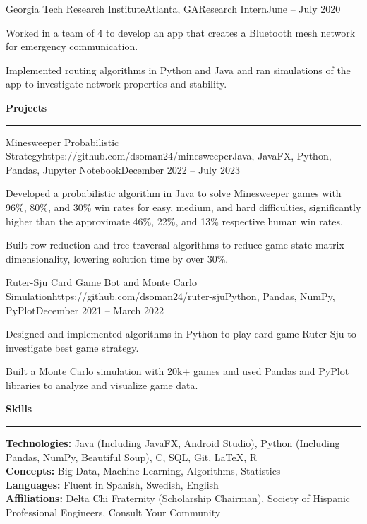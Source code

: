 \documentclass{article}
\newcommand{\horizontal}{\vspace{2pt}\hrule}
\newcommand{\sectitle}[1]{\vspace{3pt} \textbf{\large #1} \horizontal}
\newcommand{\skill}[2]{\textbf{#1:} #2}
\begin{document}
\begin{flushleft}
    \begin{experience}{Georgia Tech Research Institute}{Atlanta, GA}{Research Intern}{June -- July 2020}
        \item Worked in a team of 4 to develop an app that creates a Bluetooth mesh network for emergency communication.
        \item Implemented routing algorithms in Python and Java and ran simulations of the app to investigate network properties and stability.
    \end{experience}

\sectitle{Projects}

    \vspace{3pt}

    \begin{project}{Minesweeper Probabilistic Strategy}{https://github.com/dsoman24/minesweeper}{Java, JavaFX, Python, Pandas, Jupyter Notebook}{December 2022 -- July 2023}
        \item Developed a probabilistic algorithm in Java to solve Minesweeper games with 96\%, 80\%, and 30\% win rates for easy, medium, and hard difficulties, significantly higher than the approximate 46\%, 22\%, and 13\% respective human win rates.
        \item Built row reduction and tree-traversal algorithms to reduce game state matrix dimensionality, lowering solution time by over 30\%.
    \end{project}

    \begin{project}{Ruter-Sju Card Game Bot and Monte Carlo Simulation}{https://github.com/dsoman24/ruter-sju}{Python, Pandas, NumPy, PyPlot}{December 2021 -- March 2022}
        \item Designed and implemented algorithms in Python to play card game Ruter-Sju to investigate best game strategy.
        \item Built a Monte Carlo simulation with 20k+ games and used Pandas and PyPlot libraries to analyze and visualize game data.
    \end{project}

\sectitle{Skills}

    \vspace{3pt}
    \skill{Technologies}{Java (Including JavaFX, Android Studio), Python (Including Pandas, NumPy, Beautiful Soup), C, SQL, Git, LaTeX, R} \\
    \skill{Concepts}{Big Data, Machine Learning, Algorithms, Statistics} \\
    \skill{Languages}{Fluent in Spanish, Swedish, English} \\
    \skill{Affiliations}{Delta Chi Fraternity (Scholarship Chairman), Society of Hispanic Professional Engineers, Consult Your Community}

\end{flushleft}
\end{document}
